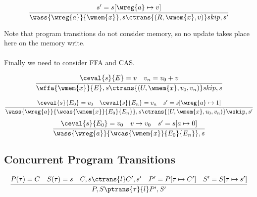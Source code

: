 \begin{minipage}{.5\textwidth}
    \[\cfrac{
        s' = s[\wreg{a} \mapsto v]
    }{
        \wass{\wreg{a}}{\wmem{x}}, s \ctrans{(R, \wmem{x}, v)} skip, s'
    }\]
\end{minipage}
Note that program transitions do not consider memory, so no update takes place here on the memory write.
\\
\\ Finally we need to consider FFA and CAS.
\\ \begin{minipage}{.5\textwidth}
    \[\cfrac{
        \ceval{s}{E} = v \quad v_n = v_0 + v
    }{
        \wffa{\wmem{x}}{E},s \ctrans{(U, \wmem{x}, v_0, v_n)} skip, s
    }\]
\end{minipage}
\begin{minipage}{.5\textwidth}
    \[
        \cfrac{
            \ceval{s}{E_0} = v_0 \quad \ceval{s}{E_n} = v_n \quad s' = s[\wreg{a} \mapsto 1]
        }{
            \wass{\wreg{a}}{\wcas{\wmem{x}}{E_0}{E_n}}, s \ctrans{(U, \wmem{x}, v_0, v_n)} \wskip, s'
        }
    \]
    \[
        \cfrac{
            \ceval{s}{E_0} = v_0 \quad v \to v_0 \quad s' = s[a \mapsto 0]
        }{
            \wass{\wreg{a}}{\wcas{\wmem{x}}{E_0}{E_n}}, s 
        }
    \]    
\end{minipage}



\subsection{Concurrent Program Transitions}
\[\cfrac{
    P(\tau) = C \quad S(\tau) = s \quad C,s \ctrans{l} C', s' \quad P' = P[\tau \mapsto C'] \quad S'=S[\tau \mapsto s']
}{
    P, S \ptrans{\tau}{l} P', S'
}\]


